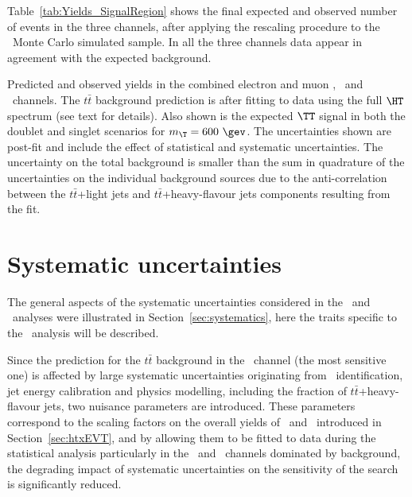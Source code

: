 Table~\ref{tab:Yields_SignalRegion} shows the final expected and
observed number of events in the three channels, after applying the rescaling
procedure to the \ttbar\ Monte Carlo simulated sample. In all the three channels
data appear in agreement with the expected background.

\begin{table}[tb]\centering

\caption{Predicted and observed yields in the combined 
electron and muon \chii, \chiii\ and \chiv\ channels. 
The $t\bar{t}$ background prediction is after fitting to data 
using the full $\HT$ spectrum (see text for details).
Also shown is the expected $\TT$ signal in both the doublet 
and singlet scenarios for $m_{\T}=600~\gev$. 
The uncertainties shown 
are post-fit and include the effect of 
statistical and systematic uncertainties. 
The uncertainty on the total background is smaller 
than the sum in quadrature of the uncertainties on the individual background
sources due to the anti-correlation between the $t\bar{t}$+light 
jets and $t\bar{t}$+heavy-flavour jets components resulting from 
the fit.\label{tab:Yields_SignalRegion}}
\end{table}


\section{Systematic uncertainties}\label{sec:htxSYS}

The general aspects of the systematic uncertainties considered
in the \wbx\ and \htx\ analyses were illustrated
in Section~\ref{sec:systematics}, here the traits specific to the
\htx\ analysis will be described.

Since the prediction for the $t\bar{t}$ background
in the \chiv\ channel (the most sensitive one) is affected by large
systematic uncertainties originating from \bjet\ identification, jet energy calibration and
physics modelling, including the fraction of $t\bar{t}$+heavy-flavour jets, 
two nuisance parameters are introduced.
These parameters correspond to the scaling factors on the overall yields of 
\tthf\ and \ttlf\ introduced in Section~\ref{sec:htxEVT}, 
and by allowing them to be fitted to data during the statistical analysis
particularly in the \chii\ and \chiii\ channels dominated by background,
the degrading impact of systematic uncertainties on the sensitivity of the search
is significantly reduced. 


